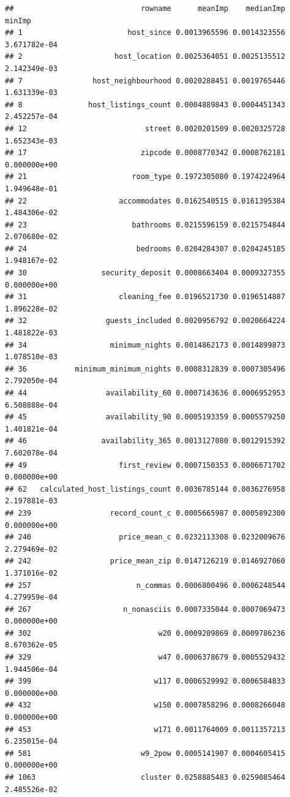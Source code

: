 \documentclass[
]{article}
\begin{document}
\begin{verbatim}
##                             rowname      meanImp    medianImp       minImp
## 1                        host_since 0.0013965596 0.0014323556 3.671782e-04
## 2                     host_location 0.0025364051 0.0025135512 2.142349e-03
## 7                host_neighbourhood 0.0020288451 0.0019765446 1.631339e-03
## 8               host_listings_count 0.0004889843 0.0004451343 2.452257e-04
## 12                           street 0.0020201509 0.0020325728 1.652343e-03
## 17                          zipcode 0.0008770342 0.0008762181 0.000000e+00
## 21                        room_type 0.1972305080 0.1974224964 1.949648e-01
## 22                     accommodates 0.0162540515 0.0161395384 1.484306e-02
## 23                        bathrooms 0.0215596159 0.0215754844 2.070680e-02
## 24                         bedrooms 0.0204284307 0.0204245185 1.948167e-02
## 30                 security_deposit 0.0008663404 0.0009327355 0.000000e+00
## 31                     cleaning_fee 0.0196521730 0.0196514887 1.896228e-02
## 32                  guests_included 0.0020956792 0.0020664224 1.481822e-03
## 34                   minimum_nights 0.0014862173 0.0014899873 1.078510e-03
## 36           minimum_minimum_nights 0.0008312839 0.0007305496 2.792050e-04
## 44                  availability_60 0.0007143636 0.0006952953 6.508888e-04
## 45                  availability_90 0.0005193359 0.0005579250 1.401821e-04
## 46                 availability_365 0.0013127080 0.0012915392 7.602078e-04
## 49                     first_review 0.0007150353 0.0006671702 0.000000e+00
## 62   calculated_host_listings_count 0.0036785144 0.0036276958 2.197881e-03
## 239                  record_count_c 0.0005665987 0.0005892300 0.000000e+00
## 240                    price_mean_c 0.0232113308 0.0232009676 2.279469e-02
## 242                  price_mean_zip 0.0147126219 0.0146927060 1.371016e-02
## 257                        n_commas 0.0006800496 0.0006248544 4.279959e-04
## 267                     n_nonasciis 0.0007335044 0.0007069473 0.000000e+00
## 302                             w20 0.0009209869 0.0009786236 8.670362e-05
## 329                             w47 0.0006378679 0.0005529432 1.944506e-04
## 399                            w117 0.0006529992 0.0006584833 0.000000e+00
## 432                            w150 0.0007858296 0.0008266048 0.000000e+00
## 453                            w171 0.0011764009 0.0011357213 6.235015e-04
## 581                         w9_2pow 0.0005141907 0.0004605415 0.000000e+00
## 1063                        cluster 0.0258885483 0.0259085464 2.485526e-02

\end{verbatim}
\end{document}
